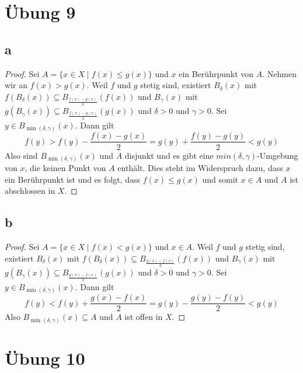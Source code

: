 \documentclass[10pt,a4paper]{article}
\begin{document}
\section*{Übung 9}

\subsection*{a}

\begin{proof}
Sei $A = \{ x \in X \mid f(x) \le g(x) \}$ und $x$ ein Berührpunkt von $A$.
Nehmen wir an $f(x) > g(x)$.
Weil $f$ und $g$ stetig sind, existiert $B_{\delta}(x)$ mit $f(B_{\delta}(x)) \subseteq B_{\frac{f(x) - g(x)}{2}}(f(x))$ und $B_{\gamma}(x)$ mit $g(B_{\gamma}(x)) \subseteq B_{\frac{f(x) - g(x)}{2}}(g(x))$ und $\delta > 0$ und $\gamma > 0$.
Sei $y \in B_{\min(\delta, \gamma)}(x)$.
Dann gilt
\begin{equation}
f(y) > f(y) - \frac{f(x) - g(x)}{2} = g(y) + \frac{f(y) - g(y)}{2} < g(y)
\end{equation}
Also sind $B_{\min(\delta, \gamma)}(x)$ und $A$ disjunkt und es gibt eine $min(\delta, \gamma)$-Umgebung von $x$, die keinen Punkt von $A$ enthält.
Dies steht im Widerspruch dazu, dass $x$ ein Berührpunkt ist und es folgt, dass $f(x) \le g(x)$ und somit $x \in A$ und $A$ ist abschlossen in $X$.
\end{proof}

\subsection*{b}

\begin{proof}
Sei $A = \{ x \in X \mid f(x) < g(x) \}$ und $x \in A$.
Weil $f$ und $g$ stetig sind, existiert $B_{\delta}(x)$ mit $f(B_{\delta}(x)) \subseteq B_{\frac{g(x) - f(x)}{2}}(f(x))$ und $B_{\gamma}(x)$ mit $g(B_{\gamma}(x)) \subseteq B_{\frac{g(x) - f(x)}{2}}(g(x))$ und $\delta > 0$ und $\gamma > 0$.
Sei $y \in B_{\min(\delta, \gamma)}(x)$.
Dann gilt
\begin{equation}
f(y) < f(y) + \frac{g(x) - f(x)}{2} = g(y) - \frac{g(y) - f(y)}{2} < g(y)
\end{equation}
Also $B_{\min(\delta, \gamma)}(x) \subseteq A$ und $A$ ist offen in $X$.
\end{proof}

\section*{Übung 10}
\end{document}
